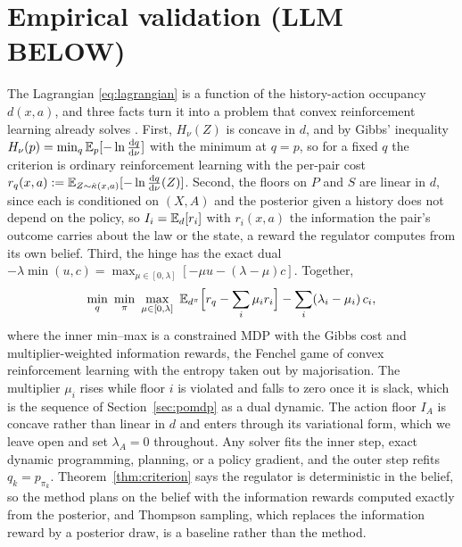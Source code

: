 \section[Empirical validation]{Empirical validation (LLM BELOW)}
\label{sec:experiments}

The Lagrangian \eqref{eq:lagrangian} is a function of the history-action occupancy $d(x,a)$, and three facts turn it into a problem that convex reinforcement learning already solves \citep{Zahavy-reward21,Mutti-convex23}.
First, $H_\nu(Z)$ is concave in $d$, and by Gibbs' inequality $H_\nu(p) = \min_q \mathbb E_p[-\ln \tfrac{\mathrm d q}{\mathrm d\nu}]$ with the minimum at $q = p$, so for a fixed $q$ the criterion is ordinary reinforcement learning with the per-pair cost $r_q(x,a) := \mathbb E_{Z \sim \hat\kappa(x,a)}[-\ln \tfrac{\mathrm d q}{\mathrm d\nu}(Z)]$.
Second, the floors on $P$\del{, $\kappa$} and $S$ are linear in $d$, since each is conditioned on $(X,A)$ and the posterior given a history does not depend on the policy, so $I_i = \mathbb E_d[r_i]$ with $r_i(x,a)$ the information the pair's outcome carries about the law or the state, a reward the regulator computes from its own belief.
Third, the hinge has the exact dual $-\lambda \min(u, c) = \max_{\mu \in [0,\lambda]} [-\mu u - (\lambda - \mu) c]$.
Together,
\begin{equation}
  \min_{q}\ \min_{\pi}\ \max_{\mu \in [0,\lambda]}\ \mathbb E_{d^{\pi}}\Big[ r_q - \sum_i \mu_i r_i \Big] - \sum_i (\lambda_i - \mu_i)\, c_i,
  \label{eq:game}
\end{equation}
where the inner min--max is a constrained MDP with the Gibbs cost and multiplier-weighted information rewards, the Fenchel game of convex reinforcement learning with the entropy taken out by majorisation.
The multiplier $\mu_i$ rises while floor $i$ is violated and falls to zero once it is slack, which is the sequence of Section~\ref{sec:pomdp} as a dual dynamic.
The action floor $I_A$ is concave rather than linear in $d$ and enters through its variational form, which we leave open and set $\lambda_A = 0$ throughout.
Any solver fits the inner step, exact dynamic programming, planning, or a policy gradient, and the outer step refits $q_k = p_{\pi_k}$.
Theorem~\ref{thm:criterion} says the regulator is deterministic in the belief, so the method plans on the belief with the information rewards computed exactly from the posterior, and Thompson sampling, which replaces the information reward by a posterior draw, is a baseline rather than the method.

